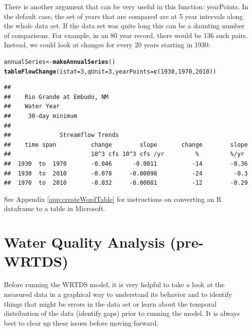 \documentclass[a4paper,11pt]{article}\usepackage{graphicx, color}
\makeatletter
\newcommand{\hlfunctioncall}[1]{\textcolor[rgb]{0.501960784313725,0,0.329411764705882}{\textbf{#1}}}%
\newenvironment{kframe}{%
 \def\at@end@of@kframe{}%
 \ifinner\ifhmode%
  \def\at@end@of@kframe{\end{minipage}}%
  \begin{minipage}{\columnwidth}%
 \fi\fi%
 \def\FrameCommand##1{\hskip\@totalleftmargin \hskip-\fboxsep
 \colorbox{shadecolor}{##1}\hskip-\fboxsep
     \hskip-\linewidth \hskip-\@totalleftmargin \hskip\columnwidth}%
 \MakeFramed {\advance\hsize-\width
   \@totalleftmargin\z@ \linewidth\hsize
   \@setminipage}}%
 {\par\unskip\endMakeFramed%
 \at@end@of@kframe}
\newenvironment{knitrout}{}{} %
\makeatother
\begin{document}
There is another argument that can be very useful in this function: yearPoints.  In the default case, the set of years that are compared are at 5 year intervals along the whole data set.  If the data set was quite long this can be a daunting number of comparisons.  For example, in an 80 year record, there would be 136 such pairs. Instead, we could look at changes for every 20 years starting in 1930: 


\begin{knitrout}
\color{fgcolor}\begin{kframe}
\begin{alltt}
annualSeries <- \hlfunctioncall{makeAnnualSeries}()
\hlfunctioncall{tableFlowChange}(istat=3, qUnit=3,yearPoints=\hlfunctioncall{c}(1930,1970,2010))
\end{alltt}
\begin{verbatim}
## 
##    Rio Grande at Embudo, NM
##    Water Year
##     30-day minimum 
## 
##              Streamflow Trends
##    time span          change        slope       change        slope
##                       10^3 cfs 10^3 cfs /yr         %         %/yr
##  1930  to  1970       -0.046      -0.0011          -14        -0.36
##  1930  to  2010       -0.078     -0.00098          -24         -0.3
##  1970  to  2010       -0.032     -0.00081          -12        -0.29
\end{verbatim}
\end{kframe}
\end{knitrout}


See Appendix \ref{app:createWordTable} for instructions on converting an R dataframe to a table in Microsoft. 

\FloatBarrier




\section{Water Quality Analysis (pre-WRTDS)}
\label{sec:wqa}
Before running the WRTDS model, it is very helpful to take a look at the measured data in a graphical way to understand its behavior and to identify things that might be errors in the data set or learn about the temporal distribution of the data (identify gaps) prior to running the model.  It is always best to clear up these issues before moving forward.
\end{document}
